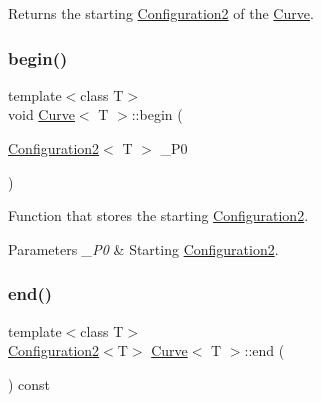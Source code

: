 Returns the starting {\ttfamily \mbox{\hyperlink{class_configuration2}{Configuration2}}} of the {\ttfamily \mbox{\hyperlink{class_curve}{Curve}}}. 

\mbox{\label{class_curve_a450ecb2eb0200c4f175ad5fc6afe4cb2}} 
\subsubsection{\texorpdfstring{begin()}{begin()}\hspace{0.1cm}{\footnotesize\ttfamily [2/2]}}
{\footnotesize\ttfamily template$<$class T$>$ \\
void \mbox{\hyperlink{class_curve}{Curve}}$<$ T $>$\+::begin (\begin{DoxyParamCaption}\item[{\mbox{\hyperlink{class_configuration2}{Configuration2}}$<$ T $>$}]{\+\_\+\+P0 }\end{DoxyParamCaption})\hspace{0.3cm}{\ttfamily [inline]}}

Function that stores the starting {\ttfamily \mbox{\hyperlink{class_configuration2}{Configuration2}}}. 
\begin{DoxyParams}{Parameters}
{\em \+\_\+\+P0} & Starting {\ttfamily \mbox{\hyperlink{class_configuration2}{Configuration2}}}. \\
\hline
\end{DoxyParams}
\mbox{\label{class_curve_a08b72b1c8922c1132254d8f2b98fd78d}} 
\subsubsection{\texorpdfstring{end()}{end()}\hspace{0.1cm}{\footnotesize\ttfamily [1/2]}}
{\footnotesize\ttfamily template$<$class T$>$ \\
\mbox{\hyperlink{class_configuration2}{Configuration2}}$<$T$>$ \mbox{\hyperlink{class_curve}{Curve}}$<$ T $>$\+::end (\begin{DoxyParamCaption}{ }\end{DoxyParamCaption}) const\hspace{0.3cm}{\ttfamily [inline]}}



